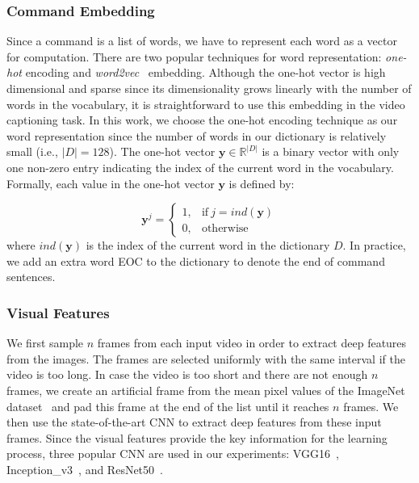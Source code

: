 \subsubsection{Command Embedding} Since a command is a list of words, we have to represent each word as a vector for computation. There are two popular techniques for word representation: \textit{one-hot} encoding and \textit{word2vec}~\cite{Mikolov2013} embedding. Although the one-hot vector is high dimensional and sparse since its dimensionality grows linearly with the number of words in the vocabulary, it is straightforward to use this embedding in the video captioning task. In this work, we choose the one-hot encoding technique as our word representation since the number of words in our dictionary is relatively small (i.e., $|D|=128$). The one-hot vector $\mathbf{y} \in {\mathbb{R}^{|D|}}$ is a binary vector with only one non-zero entry indicating the index of the current word in the vocabulary. Formally, each value in the one-hot vector $\mathbf{y}$ is defined by:

 \begin{equation}
    \mathbf{y}^j=
    \begin{cases}
      1, & \text{if}\ j=ind(\mathbf{y}) \\
      0, & \text{otherwise}
    \end{cases}
  \end{equation}
where $ind(\mathbf{y})$ is the index of the current word in the dictionary $D$. In practice, we add an extra word \textsf{EOC} to the dictionary to denote the end of command sentences.

\subsubsection{Visual Features}
We first sample $n$ frames from each input video in order to extract deep features from the images. The frames are selected uniformly with the same interval if the video is too long. In case the video is too short and there are not enough $n$ frames, we create an artificial frame from the mean pixel values of the ImageNet dataset~\cite{Olga2015} and pad this frame at the end of the list until it reaches $n$ frames. We then use the state-of-the-art CNN to extract deep features from these input frames. Since the visual features provide the key information for the learning process, three popular CNN are used in our experiments: VGG16~\cite{SimonyanZ14}, Inception\_v3~\cite{Szegedy16_Inception}, and ResNet50~\cite{He2016}.

